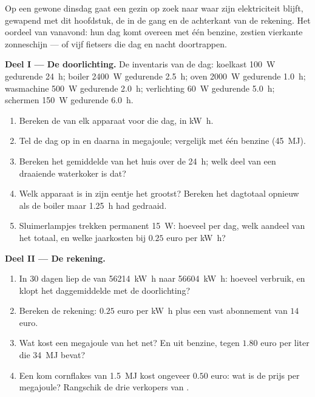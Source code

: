 \begin{problem}
\label{pb:g10:energy-conservation:1}
Op een gewone dinsdag gaat een gezin op zoek naar waar zijn elektriciteit
blijft, gewapend met dit hoofdstuk, de  in de gang en de achterkant
van de rekening. Het oordeel van vanavond: hun dag komt overeen met één
 benzine, zestien vierkante  zonneschijn --- of vijf
fietsers die dag en nacht doortrappen.

\medskip
\noindent\textbf{Deel I --- De doorlichting.}
De inventaris van de dag: koelkast \qty{100}{W} gedurende \qty{24}{h};
boiler \qty{2400}{W} gedurende \qty{2.5}{h}; oven \qty{2000}{W}
gedurende \qty{1.0}{h}; wasmachine \qty{500}{W} gedurende \qty{2.0}{h};
verlichting \qty{60}{W} gedurende \qty{5.0}{h}; schermen \qty{150}{W}
gedurende \qty{6.0}{h}.
\begin{enumerate}
  \item Bereken de  van elk apparaat voor die dag, in
        \unit{kW.h}.
  \item Tel de dag op in  en daarna in megajoule; vergelijk
        met één  benzine (\qty{45}{MJ}).
  \item Bereken het gemiddelde  van het huis over de
        \qty{24}{h}; welk deel van een draaiende waterkoker is dat?
  \item Welk apparaat is in zijn eentje het grootst? Bereken het
        dagtotaal opnieuw als de boiler maar \qty{1.25}{h} had gedraaid.
  \item Sluimerlampjes trekken permanent \qty{15}{W}: hoeveel  per
        dag, welk aandeel van het totaal, en welke jaarkosten bij $0.25$
        euro per \unit{kW.h}?
\end{enumerate}

\medskip
\noindent\textbf{Deel II --- De rekening.}
\begin{enumerate}[resume]
  \item In 30 dagen liep de  van \qty{56214}{kW.h} naar
        \qty{56604}{kW.h}: hoeveel verbruik, en klopt het daggemiddelde
        met de doorlichting?
  \item Bereken de rekening: $0.25$ euro per \unit{kW.h} plus een vast
        abonnement van $14$ euro.
  \item Wat kost een megajoule van het net? En uit benzine, tegen $1.80$
        euro per liter die \qty{34}{MJ} bevat?
  \item Een kom cornflakes van \qty{1.5}{MJ} kost ongeveer $0.50$ euro:
        wat is de prijs per megajoule? Rangschik de drie verkopers van
        .
\end{enumerate}


\end{problem}
